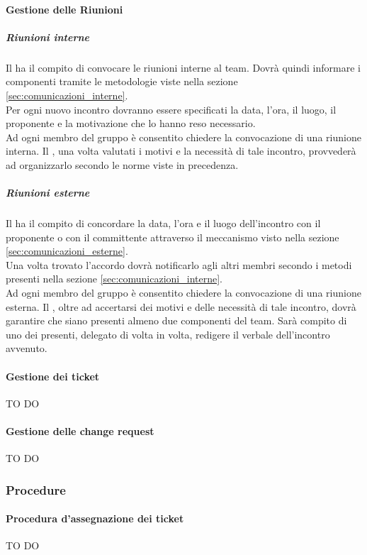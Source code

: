 			\paragraph{Gestione delle Riunioni}
				\subparagraph{Riunioni interne}
				Il \roleProjectManager{} ha il compito di convocare le riunioni interne al team. Dovrà quindi informare i componenti tramite le metodologie viste nella sezione \ref{sec:comunicazioni_interne}.\\
				Per ogni nuovo incontro dovranno essere specificati la data, l’ora, il luogo, il proponente e la motivazione che lo hanno reso necessario. \\
				Ad ogni membro del gruppo è consentito chiedere la convocazione di una riunione interna. Il \roleProjectManager{}, una volta valutati i motivi e la necessità di tale incontro, provvederà ad organizzarlo secondo le norme viste in precedenza.
				\subparagraph{Riunioni esterne} \label{sec:riunioni_esterne}
				Il \roleProjectManager{} ha il compito di concordare la data, l’ora e il luogo dell'incontro con il proponente o con il committente attraverso 	il meccanismo visto nella sezione \ref{sec:comunicazioni_esterne}. \\
				Una volta trovato l'accordo dovrà notificarlo agli altri membri secondo i metodi presenti nella sezione \ref{sec:comunicazioni_interne}. \\
				Ad ogni membro del gruppo è consentito chiedere la convocazione di una riunione esterna. Il \roleProjectManager, oltre ad accertarsi dei motivi e delle necessità di tale incontro, dovrà garantire che siano presenti almeno due componenti del team. Sarà compito di uno dei presenti, delegato di volta in volta, redigere il verbale dell’incontro avvenuto.
				
			\paragraph{Gestione dei ticket} \label{sec:gestione_dei_ticket}
			TO DO			
			\paragraph{Gestione delle change request}
			TO DO			
		\subsubsection{Procedure}
			\paragraph{Procedura d'assegnazione dei ticket}
			TO DO
